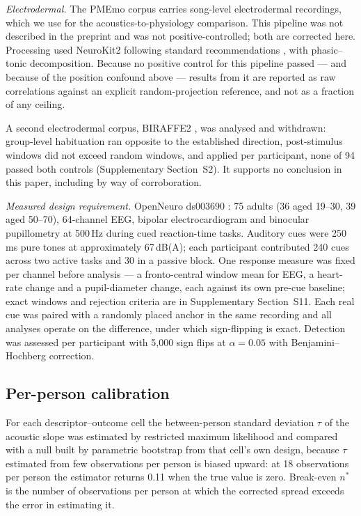 \emph{Electrodermal.} The PMEmo corpus carries song-level electrodermal
recordings, which we use for the acoustics-to-physiology comparison. This
pipeline was not described in the preprint and was not positive-controlled;
both are corrected here. Processing used NeuroKit2 \cite{makowski2021}
following standard recommendations \cite{boucsein2012}, with phasic--tonic
decomposition. Because no positive control for this pipeline passed --- and
because of the position confound above --- results from it are reported as
raw correlations against an explicit random-projection reference, and not as a
fraction of any ceiling.

A second electrodermal corpus, BIRAFFE2 \cite{kutt2022}, was analysed and
withdrawn: group-level habituation ran opposite to the established direction,
post-stimulus windows did not exceed random windows, and applied per
participant, none of 94 passed both controls (Supplementary Section~S2). It
supports no conclusion in this paper, including by way of corroboration.

\emph{Measured design requirement.} OpenNeuro ds003690
\cite{ds003690, ribeiro2019erp, ribeiro2019cardiac}: 75 adults (36 aged
19--30, 39 aged 50--70), 64-channel EEG, bipolar electrocardiogram and
binocular pupillometry at 500\,Hz during cued reaction-time tasks. Auditory
cues were 250\,ms pure tones at approximately 67\,dB(A); each participant
contributed 240 cues across two active tasks and 30 in a passive block. One
response measure was fixed per channel before analysis --- a fronto-central
window mean for EEG, a heart-rate change and a pupil-diameter change, each
against its own pre-cue baseline; exact windows and rejection criteria are in
Supplementary Section~S11. Each real cue was paired with a randomly placed
anchor in the same recording and all analyses operate on the difference, under
which sign-flipping is exact. Detection was assessed per participant with
5{,}000 sign flips at $\alpha = 0.05$ with Benjamini--Hochberg correction.

\subsection{Per-person calibration}

For each descriptor--outcome cell the between-person standard deviation
$\tau$ of the acoustic slope was estimated by restricted maximum likelihood
and compared with a null built by parametric bootstrap from that cell's own
design, because $\tau$ estimated from few observations per person is biased
upward: at 18 observations per person the estimator returns 0.11 when the true
value is zero. Break-even $n^{*}$ is the number of observations per person at
which the corrected spread exceeds the error in estimating it.

